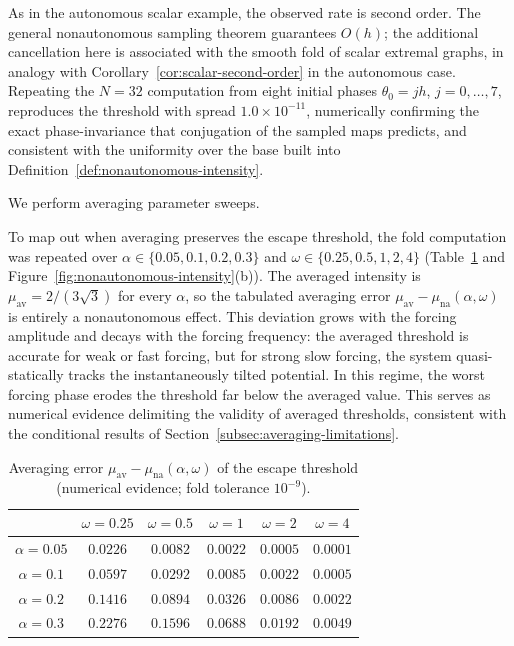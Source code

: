 \documentclass[pdflatex,sn-mathphys-num]{sn-jnl}
\numberwithin{equation}{section}
\theoremstyle{thmstyleone}%
\theoremstyle{definition}
\theoremstyle{remark}
\begin{document}
As in the autonomous scalar example, the observed rate is second order. The general nonautonomous sampling theorem guarantees \(O(h)\); the additional cancellation here is associated with the smooth fold of scalar extremal graphs, in analogy with Corollary~\ref{cor:scalar-second-order} in the autonomous case.
Repeating the \(N=32\) computation from eight initial phases \(\theta_0=jh\), \(j=0,\dots,7\), reproduces the threshold with spread \(1.0\times10^{-11}\), numerically confirming the exact phase-invariance that conjugation of the sampled maps predicts, and consistent with the uniformity over the base built into
Definition~\ref{def:nonautonomous-intensity}.

We perform averaging parameter sweeps.

To map out when averaging preserves the escape threshold, the fold computation was repeated over $\alpha\in\{0.05,0.1,0.2,0.3\}$ and $\omega\in\{0.25,0.5,1,2,4\}$ (Table~\ref{tab:averaging-sweep} and Figure~\ref{fig:nonautonomous-intensity}(b)). The averaged intensity is $\mu_{\mathrm{av}}=2/(3\sqrt3)$ for every $\alpha$, so the tabulated averaging error $\mu_{\mathrm{av}}-\mu_{\mathrm{na}}(\alpha,\omega)$ is entirely a nonautonomous effect. This deviation grows with the forcing amplitude and decays with the forcing frequency: the averaged threshold is accurate for weak or fast forcing, but for strong slow forcing, the system quasi-statically tracks the instantaneously tilted potential. 
In this regime, the worst forcing phase erodes the threshold far below the averaged value.
This serves as numerical evidence delimiting the validity of averaged thresholds, consistent with the conditional results of Section~\ref{subsec:averaging-limitations}.

\begin{table}[t]
    \centering
    \caption{Averaging error
    \(\mu_{\mathrm{av}}-\mu_{\mathrm{na}}(\alpha,\omega)\) of the
    escape threshold (numerical evidence; fold tolerance
    $10^{-9}$).}
    \label{tab:averaging-sweep}
    \begin{tabular}{cccccc}
        \toprule
        & \(\omega=0.25\) & \(\omega=0.5\) & \(\omega=1\)
        & \(\omega=2\) & \(\omega=4\)\\
        \midrule
        \(\alpha=0.05\) & \(0.0226\) & \(0.0082\) & \(0.0022\)
                        & \(0.0005\) & \(0.0001\)\\
        \(\alpha=0.1\)  & \(0.0597\) & \(0.0292\) & \(0.0085\)
                        & \(0.0022\) & \(0.0005\)\\
        \(\alpha=0.2\)  & \(0.1416\) & \(0.0894\) & \(0.0326\)
                        & \(0.0086\) & \(0.0022\)\\
        \(\alpha=0.3\)  & \(0.2276\) & \(0.1596\) & \(0.0688\)
                        & \(0.0192\) & \(0.0049\)\\
        \bottomrule
    \end{tabular}
\end{table}
\end{document}
